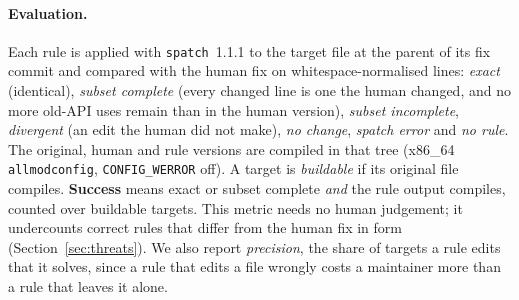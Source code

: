 \paragraph{Evaluation.} Each rule is applied with \texttt{spatch}~1.1.1 to the target file at the parent of its fix
commit and compared with the human fix on whitespace-normalised lines: \emph{exact} (identical), \emph{subset
complete} (every changed line is one the human changed, and no more old-API uses remain than in the human
version), \emph{subset incomplete}, \emph{divergent} (an edit the human did not make), \emph{no change},
\emph{spatch error} and \emph{no rule}. The original, human and rule versions are compiled in that tree (x86\_64
\texttt{allmodconfig}, \texttt{CONFIG\_WERROR} off). A target is \emph{buildable} if its original file compiles.
\textbf{Success} means exact or subset complete \emph{and} the rule output compiles, counted over buildable targets.
This metric needs no human judgement; it undercounts correct rules that differ from the human fix in form
(Section~\ref{sec:threats}). We also report \emph{precision}, the share of targets a rule edits that it solves,
since a rule that edits a file wrongly costs a maintainer more than a rule that leaves it alone.
